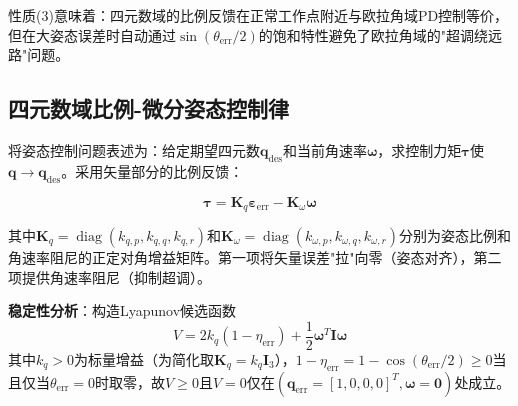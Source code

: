 性质(3)意味着：四元数域的比例反馈在正常工作点附近与欧拉角域PD控制等价，但在大姿态误差时自动通过$\sin(\theta_{\text{err}}/2)$的饱和特性避免了欧拉角域的"超调绕远路"问题。

\subsection{四元数域比例-微分姿态控制律}

将姿态控制问题表述为：给定期望四元数$\mathbf{q}_{\text{des}}$和当前角速率$\boldsymbol{\omega}$，求控制力矩$\boldsymbol{\tau}$使$\mathbf{q} \to \mathbf{q}_{\text{des}}$。采用矢量部分的比例反馈\cite{wie1989quaternion,fresk2013full}：

\begin{equation}
    \boxed{\boldsymbol{\tau} = \mathbf{K}_q \boldsymbol{\varepsilon}_{\text{err}} - \mathbf{K}_\omega \boldsymbol{\omega}}
    \label{eq:quat_pd}
\end{equation}

其中$\mathbf{K}_q = \operatorname{diag}(k_{q,p}, k_{q,q}, k_{q,r})$和$\mathbf{K}_\omega = \operatorname{diag}(k_{\omega,p}, k_{\omega,q}, k_{\omega,r})$分别为姿态比例和角速率阻尼的正定对角增益矩阵。第一项将矢量误差"拉"向零（姿态对齐），第二项提供角速率阻尼（抑制超调）。

\textbf{稳定性分析}：构造Lyapunov候选函数
\begin{equation}
    V = 2k_q(1 - \eta_{\text{err}}) + \frac{1}{2}\boldsymbol{\omega}^T \mathbf{I} \boldsymbol{\omega}
    \label{eq:lyap_quat}
\end{equation}
其中$k_q > 0$为标量增益（为简化取$\mathbf{K}_q = k_q\mathbf{I}_3$），$1-\eta_{\text{err}} = 1-\cos(\theta_{\text{err}}/2) \geq 0$当且仅当$\theta_{\text{err}}=0$时取零，故$V \geq 0$且$V=0$仅在$(\mathbf{q}_{\text{err}}=[1,0,0,0]^T, \boldsymbol{\omega}=\mathbf{0})$处成立。

